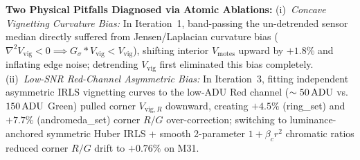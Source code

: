 \documentclass[10pt,twocolumn,letterpaper]{article}
\DeclareRobustCommand{\code}[1]{\texttt{#1}}
\def\code#1{#1}%
\begin{document}
\noindent\textbf{Two Physical Pitfalls Diagnosed via Atomic Ablations:}
(i)~\emph{Concave Vignetting Curvature Bias:} In Iteration~1, band-passing the un-detrended sensor median directly suffered from Jensen/Laplacian curvature bias ($\nabla^2 V_{\text{vig}} < 0 \implies G_\sigma * V_{\text{vig}} < V_{\text{vig}}$), shifting interior $V_{\text{motes}}$ upward by $+1.8\%$ and inflating edge noise; detrending $V_{\text{vig}}$ first eliminated this bias completely.
(ii)~\emph{Low-SNR Red-Channel Asymmetric Bias:} In Iteration~3, fitting independent asymmetric IRLS vignetting curves to the low-ADU Red channel ($\sim 50\text{\,ADU}$ vs.\ $150\text{\,ADU}$ Green) pulled corner $V_{\text{vig},R}$ downward, creating $+4.5\%$ (\code{ring\_set}) and $+7.7\%$ (\code{andromeda\_set}) corner $R/G$ over-correction; switching to luminance-anchored symmetric Huber IRLS + smooth 2-parameter $1 + \beta_c r^2$ chromatic ratios reduced corner $R/G$ drift to $+0.76\%$ on M31.
\end{document}
